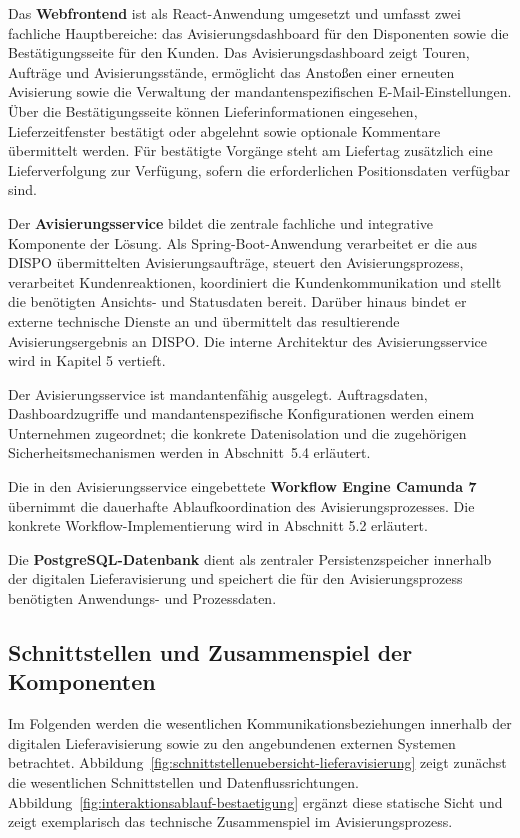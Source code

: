 \documentclass[
  12pt,
  a4paper,
  oneside
]{article}
\begin{document}
Das \textbf{Webfrontend} ist als React-Anwendung umgesetzt und umfasst zwei
fachliche Hauptbereiche: das Avisierungsdashboard für den Disponenten sowie
die Bestätigungsseite für den Kunden. Das Avisierungsdashboard zeigt Touren,
Aufträge und Avisierungsstände, ermöglicht das Anstoßen einer erneuten
Avisierung sowie die Verwaltung der mandantenspezifischen
E-Mail-Einstellungen. Über die Bestätigungsseite können Lieferinformationen
eingesehen, Lieferzeitfenster bestätigt oder abgelehnt sowie optionale
Kommentare übermittelt werden. Für bestätigte Vorgänge steht am Liefertag
zusätzlich eine Lieferverfolgung zur Verfügung, sofern die erforderlichen
Positionsdaten verfügbar sind.

Der \textbf{Avisierungsservice} bildet die zentrale fachliche und integrative
Komponente der Lösung. Als Spring-Boot-Anwendung verarbeitet er die aus DISPO
übermittelten Avisierungsaufträge, steuert den Avisierungsprozess, verarbeitet
Kundenreaktionen, koordiniert die Kundenkommunikation und stellt die
benötigten Ansichts- und Statusdaten bereit. Darüber hinaus bindet er externe
technische Dienste an und übermittelt das resultierende Avisierungsergebnis an
DISPO. Die interne Architektur des Avisierungsservice wird in Kapitel 5
vertieft.

Der Avisierungsservice ist mandantenfähig ausgelegt. Auftragsdaten,
Dashboardzugriffe und mandantenspezifische Konfigurationen werden einem
Unternehmen zugeordnet; die konkrete Datenisolation und die zugehörigen
Sicherheitsmechanismen werden in Abschnitt~5.4 erläutert.

Die in den Avisierungsservice eingebettete \textbf{Workflow Engine Camunda 7}
übernimmt die dauerhafte Ablaufkoordination des Avisierungsprozesses. Die
konkrete Workflow-Implementierung wird in Abschnitt 5.2 erläutert.

Die \textbf{PostgreSQL-Datenbank} dient als zentraler Persistenzspeicher
innerhalb der digitalen Lieferavisierung und speichert die für den
Avisierungsprozess benötigten Anwendungs- und Prozessdaten.

\subsection{Schnittstellen und Zusammenspiel der Komponenten}
\label{sec:schnittstellen-zusammenspiel}

Im Folgenden werden die wesentlichen Kommunikationsbeziehungen innerhalb der
digitalen Lieferavisierung sowie zu den angebundenen externen Systemen
betrachtet. Abbildung~\ref{fig:schnittstellenuebersicht-lieferavisierung} zeigt
zunächst die wesentlichen Schnittstellen und Datenflussrichtungen.
Abbildung~\ref{fig:interaktionsablauf-bestaetigung} ergänzt diese statische
Sicht und zeigt exemplarisch das technische Zusammenspiel im
Avisierungsprozess.
\end{document}
